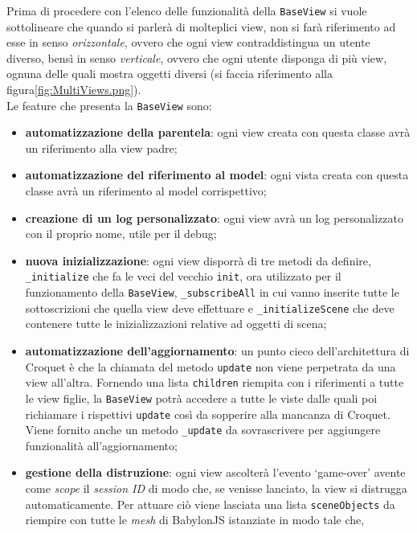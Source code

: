 Prima di procedere con l'elenco delle funzionalità della \texttt{BaseView} si vuole sottolineare che quando si parlerà di molteplici view, non si farà riferimento ad esse in senso
\textit{orizzontale}, ovvero che ogni view contraddistingua un utente diverso, bensì in senso \textit{verticale}, ovvero che ogni utente disponga di più view, ognuna delle quali mostra
oggetti diversi (si faccia riferimento alla figura\ref{fig:MultiViews.png}).\\
Le feature che presenta la \texttt{BaseView} sono:
\begin{itemize}
    \item \textbf{automatizzazione della parentela}: ogni view creata con questa classe avrà un riferimento alla view padre;
    \item \textbf{automatizzazione del riferimento al model}: ogni vista creata con questa classe avrà un riferimento al model corrispettivo;
    \item \textbf{creazione di un log personalizzato}: ogni view avrà un log personalizzato con il proprio nome, utile per il debug;
    \item \textbf{nuova inizializzazione}: ogni view disporrà di tre metodi da definire, \texttt{\_initialize} che fa le veci del vecchio \texttt{init}, ora utilizzato per il funzionamento
    della \texttt{BaseView}, \texttt{\_subscribeAll} in cui vanno inserite tutte le sottoscrizioni che quella view deve effettuare e \texttt{\_initializeScene} che deve contenere tutte le
    inizializzazioni relative ad oggetti di scena;
    \item \textbf{automatizzazione dell'aggiornamento}: un punto cieco dell'architettura di Croquet è che la chiamata del metodo \texttt{update} non viene perpetrata da una view all'altra.
    Fornendo una lista \texttt{children} riempita con i riferimenti a tutte le view figlie, la \texttt{BaseView} potrà accedere a tutte le viste dalle quali poi richiamare i rispettivi
    \texttt{update} così da sopperire alla mancanza di Croquet. Viene fornito anche un metodo \texttt{\_update} da sovrascrivere per aggiungere funzionalità all'aggiornamento;
    \item \textbf{gestione della distruzione}: ogni view ascolterà l'evento `game-over' avente come \textit{scope} il \textit{session ID} di modo che, se venisse lanciato, la view
    si distrugga automaticamente. Per attuare ciò viene lasciata una lista \texttt{sceneObjects} da riempire con tutte le \textit{mesh} di BabylonJS istanziate in modo tale che,

\end{itemize}
